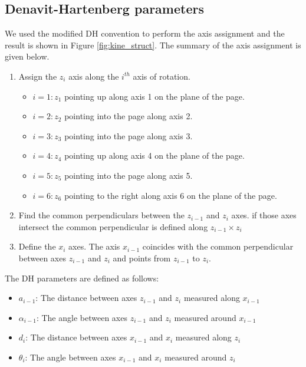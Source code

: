 \subsection{Denavit-Hartenberg parameters}\label{subsec:dh}
We used the modified DH convention to perform the axis assignment and the result is shown
in Figure \ref{fig:kine_struct}.
The summary of the axis assignment is given below.
\begin{enumerate}
    \item Assign the $z_i$ axis along the $i^{th}$ axis of rotation.
          \begin{itemize}
              \item $i=1: z_1$ pointing up along axis 1 on the plane of the page.
              \item $i=2: z_2$ pointing into the page along axis 2.
              \item $i=3: z_3$ pointing into the page along axis 3.
              \item $i=4: z_4$ pointing up along axis 4 on the plane of the page.
              \item $i=5: z_5$ pointing into the page along axis 5.
              \item $i=6: z_6$ pointing to the right along axis 6 on the plane of the page.
          \end{itemize}
    \item Find the common perpendiculars between the $z_{i-1}$ and $z_i$ axes.
          if those axes intersect the common perpendicular is defined along $z_{i-1}\times z_i$
    \item Define the $x_i$ axes. The axis $x_{i-1}$ coincides with the common perpendicular between
          axes $z_{i-1}$ and $z_i$ and points from $z_{i-1}$ to $z_i$.
\end{enumerate}
The DH parameters are defined as follows:
\begin{itemize}
    \item $a_{i-1}$: The distance between axes $z_{i-1}$ and $z_i$ measured along $x_{i-1}$
    \item $\alpha_{i-1}$: The angle between axes $z_{i-1}$ and $z_i$ measured around $x_{i-1}$
    \item $d_i$: The distance between axes $x_{i-1}$ and $x_i$ measured along $z_i$
    \item $\theta_i$: The angle between axes $x_{i-1}$ and $x_i$ measured around $z_i$
\end{itemize}
